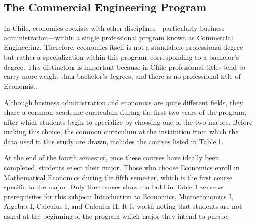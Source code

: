 \subsection{ The Commercial Engineering Program}
In Chile, economics coexists with other disciplines—particularly business administration—within a single professional program known as Commercial Engineering. Therefore, economics itself is not a standalone professional degree but rather a specialization within this program, corresponding to a bachelor's degree. This distinction is important because in Chile professional titles tend to carry more weight than bachelor’s degrees, and there is no professional title of Economist.

Although business administration and economics are quite different fields, they share a common academic curriculum during the first two years of the program, after which students begin to specialize by choosing one of the two majors. Before making this choice, the common curriculum at the institution from which the data used in this study are drawn, includes the courses listed in Table 1.

At the end of the fourth semester, once these courses have ideally been completed, students select their major. Those who choose Economics enroll in Mathematical Economics during the fifth semester, which is the first course specific to the major. Only the courses shown in bold in Table 1 serve as prerequisites for this subject: Introduction to Economics, Microeconomics I, Algebra I, Calculus I, and Calculus II. It is worth noting that students are not asked at the beginning of the program which major they intend to pursue.

